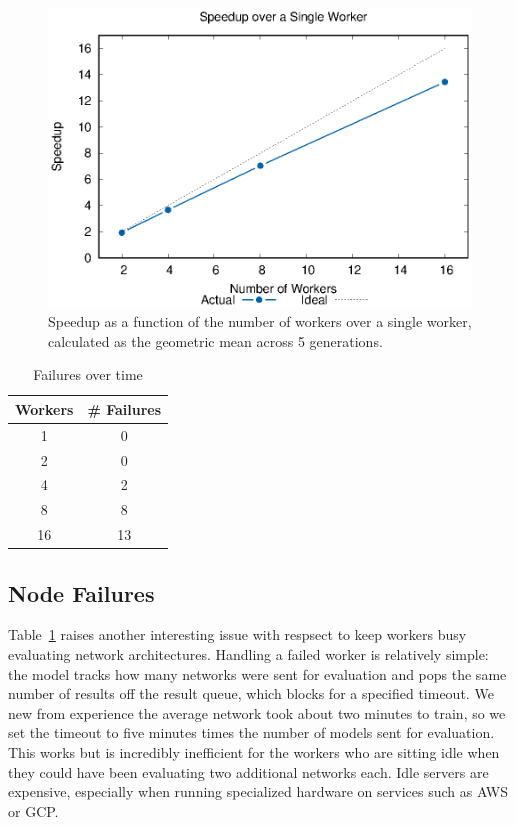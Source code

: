 \documentclass[conference]{IEEEtran}
\begin{document}
\begin{figure}
  \centering
  \includegraphics[width=\columnwidth]{result/output/rates}
  \caption{Speedup as a function of the number of workers over a single worker,
    calculated as the geometric mean across 5 generations.}
  \label{fig:scale}
\end{figure}

\begin{table}
  \centering
  \caption{Failures over time}
  \label{tab:failures}
  \begin{tabular}{cc}\toprule
    \textbf{Workers} & \textbf{\# Failures}\\\midrule
    1 & 0\\
    2 & 0\\
    4 & 2\\
    8 & 8\\
    16 & 13\\\bottomrule
  \end{tabular}
\end{table}
\subsection{Node Failures}
Table~\ref{tab:failures} raises another interesting issue with respsect
to keep workers busy evaluating network architectures. Handling a failed
worker is relatively simple: the model tracks how many networks were
sent for evaluation and pops the same number of results off the result
queue, which blocks for a specified timeout. We new from experience the
average network took about two minutes to train, so we set the timeout to
five minutes times the number of models sent for evaluation. This works
but is incredibly inefficient for the workers who are sitting idle when
they could have been evaluating two additional networks each. Idle servers
are expensive, especially when running specialized hardware on services
such as AWS or GCP.
\end{document}
